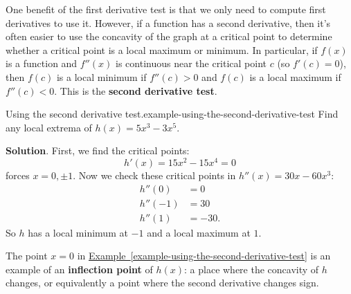 \documentclass[10pt,]{book}
\newcommand{\terminology}[1]{\textbf{#1}}
\numberwithin{equation}{section}
\begin{document}
\hypertarget{p-351}{}%
One benefit of the first derivative test is that we only need to compute first derivatives to use it. However, if a function has a second derivative, then it's often easier to use the concavity of the graph at a critical point to determine whether a critical point is a local maximum or minimum. In particular, if \(f(x)\) is a function and \(f''(x)\) is continuous near the critical point \(c\) (so \(f'(c) = 0\)), then \(f(c)\) is a local minimum if \(f''(c) > 0\) and \(f(c)\) is a local maximum if \(f''(c) < 0\). This is the \terminology{second derivative test}.%
\begin{example}{Using the second derivative test.}{example-using-the-second-derivative-test}%
\hypertarget{p-352}{}%
Find any local extrema of \(h(x) = 5x^{3} - 3x^{5}\).%
\par\smallskip%
\noindent\textbf{Solution}.\hypertarget{solution-77}{}\quad%
\hypertarget{p-353}{}%
First, we find the critical points:%
\begin{equation*}
h'(x) = 15x^{2} - 15x^{4} = 0
\end{equation*}
forces \(x=0,\pm1\). Now we check these critical points in \(h''(x) = 30x - 60x^{3}:\)%
\begin{align*}
h''(0) & = 0 \\
h''(-1) & = 30 \\
h''(1) & = -30. 
\end{align*}
So \(h\) has a local minimum at \(-1\) and a local maximum at \(1\).%
\end{example}
\hypertarget{p-354}{}%
The point \(x=0\) in \hyperref[example-using-the-second-derivative-test]{Example~\ref{example-using-the-second-derivative-test}} is an example of an \terminology{inflection point} of \(h(x)\): a place where the concavity of \(h\) changes, or equivalently a point where the second derivative changes sign.%
%
%
\typeout{************************************************}
\typeout{************************************************}
%
\end{document}
